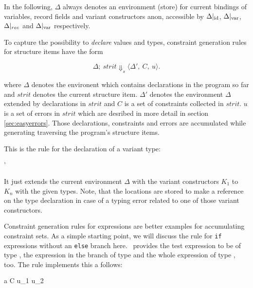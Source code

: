 In the following, $\Delta$ always denotes an environment (store) for current
bindings of variables, record fields and variant constructors anon, accessible
by $\Delta|_{\text{id}}$, $\Delta|_{\text{var}}$, $\Delta|_{rec}$ and $\Delta|_{\text{var}}$
respectively.

To capture the possibility to \emph{declare} values and types, constraint
generation rules for structure items have the form

\[ \Delta;\ strit \Downarrow_s \langle \Delta',\ C,\ u\rangle.\]

\noindent where $\Delta$ denotes the environent which contains declarations in
the program so far and $strit$ denotes the current structure item.
$\Delta'$ denotes the environment $\Delta$ extended by declarations in $strit$
and $C$ is a set of constraints collected in $strit$.
$u$ is a set of errors in $strit$ which are desribed in more detail in section
\ref{sec:easyerrors}.
Those declarations, constraints and errors are accumulated while generating
traversing the program's structure items.

This is the rule for the declaration of a variant type:

\vspace{1em}\centerline{
{\styjudge {} {\Delta'} \emptyset \emptyset}}
\vspace{1em}

\noindent It just extends the current environment $\Delta$ with the variant constructors
$K_1$ to $K_n$ with the given types.
Note, that the locations are stored to make a reference on the type declaration
in case of a typing error related to one of those variant constructors.

Constraint generation rules for expressions are better examples for
accumulating constraint sets.
As a simple starting point, we will discuss the rule for \texttt{if} expressions
without an \texttt{else} branch here.
\ocaml\ provides the test expression to be of type , the expression
in the branch of type  and the whole expression of type ,
too. The rule implements this a follows:

\vspace{1em}\centerline{
{\etyjudge {} a C {u_1 \cup u_2}}
}\vspace{1em}

